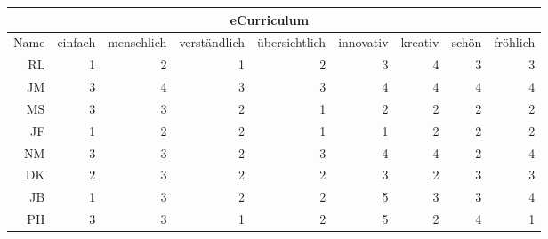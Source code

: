 \documentclass[a4paper,10pt]{scrartcl}
\begin{document}
\begin{center}
\begin{tabular}{r|r|r|r|r|r|r|r|r}
     & \multicolumn{7}{c}{eCurriculum} \\ \hline
    Name & einfach & menschlich & verständlich & übersichtlich & innovativ & kreativ & schön & fröhlich \\ \hline
    RL & 1 & 2 & 1 & 2 & 3 & 4 & 3 & 3 \\ \hline
    JM & 3 & 4 & 3 & 3 & 4 & 4 & 4 & 4 \\ \hline
    MS & 3 & 3 & 2 & 1 & 2 & 2 & 2 & 2 \\ \hline
    JF & 1 & 2 & 2 & 1 & 1 & 2 & 2 & 2 \\ \hline
    NM & 3 & 3 & 2 & 3 & 4 & 4 & 2 & 4 \\ \hline
    DK & 2 & 3 & 2 & 2 & 3 & 2 & 3 & 3 \\ \hline
    JB & 1 & 3 & 2 & 2 & 5 & 3 & 3 & 4 \\ \hline
    PH & 3 & 3 & 1 & 2 & 5 & 2 & 4 & 1 \\
\end{tabular}
\end{center}
\end{document}
